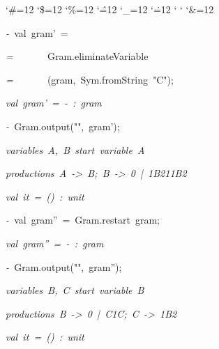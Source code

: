 \begin{list}{}
{\setlength{\leftmargin}{\leftmargini}
\setlength{\rightmargin}{0cm}
\setlength{\itemindent}{0cm}
\setlength{\listparindent}{0cm}
\setlength{\itemsep}{0cm}
\setlength{\parsep}{0cm}
\setlength{\labelsep}{0cm}
\setlength{\labelwidth}{0cm}
\catcode`\#=12
\catcode`\$=12
\catcode`\%=12
\catcode`\^=12
\catcode`\_=12
\catcode`\.=12
\catcode`
\catcode`
\catcode`\&=12
\ttfamily}
\small
\item[]\textsl{-\ }val\ gram'\ =
\item[]\textsl{=\ }\ \ \ \ \ \ Gram.eliminateVariable
\item[]\textsl{=\ }\ \ \ \ \ \ (gram,\ Sym.fromString\ "C");
\item[]\textsl{val\ gram'\ =\ -\ :\ gram}
\item[]\textsl{-\ }Gram.output("",\ gram');
\item[]\textsl{variables\ A,\ B\ start\ variable\ A}
\item[]\textsl{productions\ A\ ->\ B;\ B\ ->\ 0\ |\ 1B211B2}
\item[]\textsl{val\ it\ =\ ()\ :\ unit}
\item[]\textsl{-\ }val\ gram''\ =\ Gram.restart\ gram;
\item[]\textsl{val\ gram''\ =\ -\ :\ gram}
\item[]\textsl{-\ }Gram.output("",\ gram'');
\item[]\textsl{variables\ B,\ C\ start\ variable\ B}
\item[]\textsl{productions\ B\ ->\ 0\ |\ C1C;\ C\ ->\ 1B2}
\item[]\textsl{val\ it\ =\ ()\ :\ unit}
\end{list}
